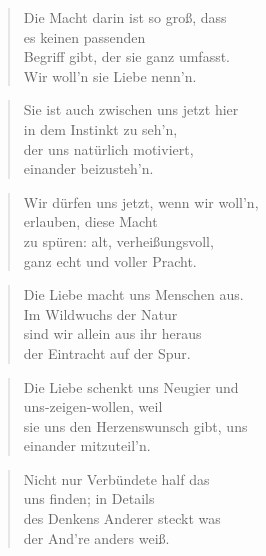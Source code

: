 \documentclass[10pt,a4paper]{article}
\begin{document}
\begin{paracol}{2}
\begin{verse}
Die Macht darin ist so groß, dass \\
es keinen passenden \\
Begriff gibt, der sie ganz umfasst. \\
Wir woll’n sie Liebe nenn’n. \\
\end{verse}

\begin{verse}
Sie ist auch zwischen uns jetzt hier \\
in dem Instinkt zu seh’n, \\
der uns natürlich motiviert, \\
einander beizusteh’n. \\
\end{verse}

\begin{verse}
Wir dürfen uns jetzt, wenn wir woll’n, \\
erlauben, diese Macht \\
zu spüren: alt, verheißungsvoll, \\
ganz echt und voller Pracht. \\
\end{verse}

\begin{verse}
Die Liebe macht uns Menschen aus. \\
Im Wildwuchs der Natur \\
sind wir allein aus ihr heraus \\
der Eintracht auf der Spur. \\
\end{verse}

\begin{verse}
Die Liebe schenkt uns Neugier und \\
uns-zeigen-wollen, weil \\
sie uns den Herzenswunsch gibt, uns \\
einander mitzuteil’n. \\
\end{verse}

\begin{verse}
Nicht nur Verbündete half das \\
uns finden; in Details \\
des Denkens Anderer steckt was \\
der And’re anders weiß. \\
\end{verse}


\end{paracol}
\end{document}

